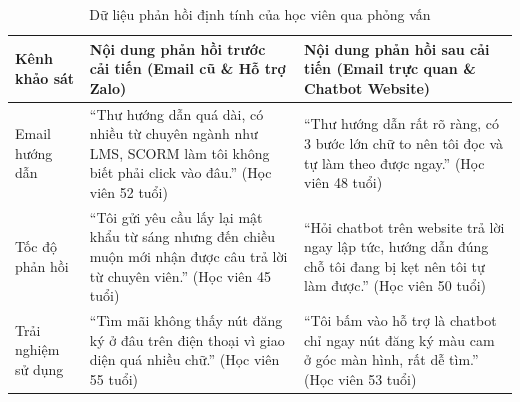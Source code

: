 \begin{table}[htbp]
\centering
\fontsize{9}{12}\selectfont
\begin{tabular}{|p{3.5cm}|p{6cm}|p{6cm}|}
\hline
\textbf{Kênh khảo sát} & \textbf{Nội dung phản hồi trước cải tiến (Email cũ \& Hỗ trợ Zalo)} & \textbf{Nội dung phản hồi sau cải tiến (Email trực quan \& Chatbot Website)} \\ \hline
Email hướng dẫn & ``Thư hướng dẫn quá dài, có nhiều từ chuyên ngành như LMS, SCORM làm tôi không biết phải click vào đâu.'' (Học viên 52 tuổi) & ``Thư hướng dẫn rất rõ ràng, có 3 bước lớn chữ to nên tôi đọc và tự làm theo được ngay.'' (Học viên 48 tuổi) \\ \hline
Tốc độ phản hồi & ``Tôi gửi yêu cầu lấy lại mật khẩu từ sáng nhưng đến chiều muộn mới nhận được câu trả lời từ chuyên viên.'' (Học viên 45 tuổi) & ``Hỏi chatbot trên website trả lời ngay lập tức, hướng dẫn đúng chỗ tôi đang bị kẹt nên tôi tự làm được.'' (Học viên 50 tuổi) \\ \hline
Trải nghiệm sử dụng & ``Tìm mãi không thấy nút đăng ký ở đâu trên điện thoại vì giao diện quá nhiều chữ.'' (Học viên 55 tuổi) & ``Tôi bấm vào hỗ trợ là chatbot chỉ ngay nút đăng ký màu cam ở góc màn hình, rất dễ tìm.'' (Học viên 53 tuổi) \\ \hline
\end{tabular}
\caption{Dữ liệu phản hồi định tính của học viên qua phỏng vấn}
\label{tab:qualitative_results}
\end{table}
